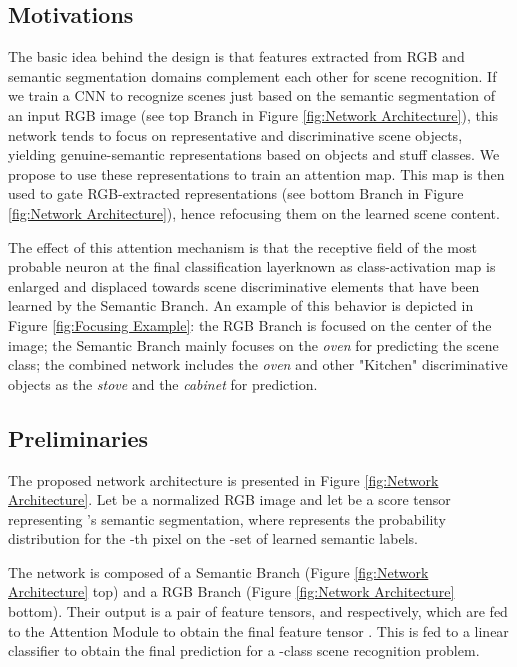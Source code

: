 \documentclass[review, 3p, sort&compress]{elsarticle}
\begin{document}
\subsection{Motivations}
The basic idea behind the design is that features extracted from RGB and semantic segmentation domains complement each other for scene recognition. If we train a CNN to recognize scenes just based on the semantic segmentation of an input RGB image (see top Branch in Figure \ref{fig:Network Architecture}), this network tends to focus on representative and discriminative scene objects, yielding genuine-semantic representations based on objects and stuff classes. We propose to use these representations to train an attention map. This map is then used to gate RGB-extracted representations (see bottom Branch in Figure \ref{fig:Network Architecture}), hence refocusing them on the learned scene content.

The effect of this attention mechanism is that the receptive field of the most probable neuron at the final classification layer\textemdash known as class-activation map \cite{zhou2015cnnlocalization}\textemdash is enlarged and displaced towards scene discriminative elements that have been learned by the Semantic Branch. An example of this behavior is depicted in Figure \ref{fig:Focusing Example}: the RGB Branch is focused on the center of the image; the Semantic Branch mainly focuses on the \textit{oven} for predicting the scene class; the combined network includes the \textit{oven} and other "Kitchen" discriminative objects as the \textit{stove} and the \textit{cabinet} for prediction.

\subsection{Preliminaries} \label{subsec:Network Architecture}
The proposed network architecture is presented in Figure \ref{fig:Network Architecture}. Let  be a normalized RGB image and let  be a score tensor representing 's semantic segmentation, where  represents the probability distribution for the -th pixel on the -set of learned semantic labels. 

The network is composed of a Semantic Branch (Figure \ref{fig:Network Architecture} top) and a RGB Branch (Figure \ref{fig:Network Architecture} bottom). Their output is a pair of feature tensors,  and  respectively, which are fed to the Attention Module to obtain the final feature tensor . This is fed to a linear classifier to obtain the final prediction for a -class scene recognition problem.
\end{document}
